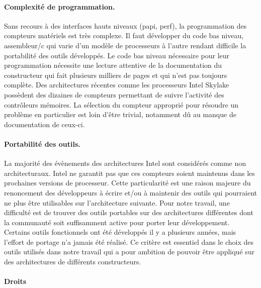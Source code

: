  
  \paragraph{Complexité de programmation.} 
        
        Sans recours à des interfaces hauts niveaux (papi, perf), la programmation des compteurs matériels est très complexe. Il faut développer du code bas niveau, assembleur/c qui varie d'un modèle de processeurs à l'autre rendant difficile la portabilité des outils développés. Le code bas niveau nécessaire pour leur programmation nécessite une lecture attentive de la documentation du constructeur qui fait plusieurs milliers de pages et qui n'est pas toujours complète. Des architectures récentes comme les processeurs Intel Skylake possèdent des dizaines de compteurs permettant de suivre l'activité des contrôleurs mémoires. La sélection du compteur approprié pour résoudre un problème en particulier est loin d'être trivial, notamment dû au manque de documentation de ceux-ci. 

            
    \paragraph{Portabilité des outils.}
        
        La majorité des évènements des architectures Intel sont considérés comme non architecturaux. Intel ne garantit pas que ces compteurs soient maintenus dans les prochaines versions de processeur. Cette particularité est une raison majeure du renoncement des développeurs à écrire et/ou à maintenir des outils qui pourraient ne plus être utilisables sur l'architecture suivante.
        Pour notre travail, une difficulté est de trouver des outils portables sur des architectures différentes dont la communauté soit suffisamment active pour porter leur développement. Certains outils fonctionnels ont été développés il y a plusieurs années, mais l'effort de portage n'a jamais été réalisé. Ce critère est essentiel dans le choix des outils utilisés dans notre travail qui a pour ambition de pouvoir être appliqué sur des architectures de différents constructeurs.
  
    \paragraph{Droits}
    
